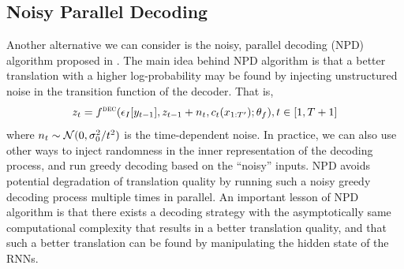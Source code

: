 \subsection{Noisy Parallel Decoding}
\label{cp2.sec.noisy}
Another alternative we can consider is the noisy, parallel decoding (NPD) algorithm proposed in . The main idea behind NPD algorithm is that a better translation with a higher log-probability may be found by injecting unstructured noise in the transition function of the decoder. That is,
\begin{equation}
z_t = f^{\textsc{dec}}(\epsilon_I[y_{t-1}], z_{t-1} + n_t, c_t(x_{1:T'}); \theta_f), t\in [1, T+1]
\end{equation}
where $n_t \sim \mathcal{N}(0, {\sigma_0^2} \large / {t^2})$ is the time-dependent noise. In practice, we can also use other ways to inject randomness in the inner representation of the decoding process, and run greedy decoding based on the ``noisy'' inputs. 
NPD avoids potential degradation of translation quality by running such a noisy greedy decoding process multiple times in parallel. An important lesson of NPD algorithm is that there exists a decoding strategy with the asymptotically same computational complexity that results in a better translation quality, and that such a better translation can be found by manipulating the hidden state of the RNNs.

